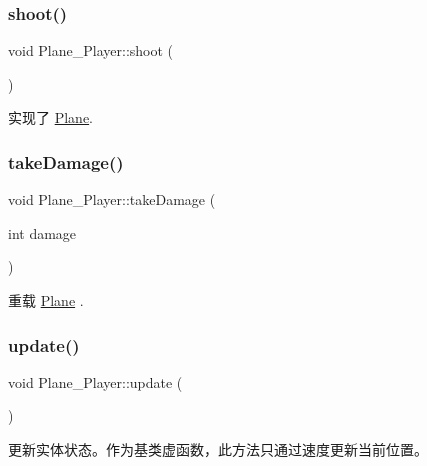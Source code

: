 \subsubsection{\texorpdfstring{shoot()}{shoot()}}
{\footnotesize\ttfamily void Plane\+\_\+\+Player\+::shoot (\begin{DoxyParamCaption}{ }\end{DoxyParamCaption})\hspace{0.3cm}{\ttfamily [virtual]}}



实现了 \hyperlink{class_plane_af999499b5e79309d94004e8d012fe9c4}{Plane}.

\mbox{\label{class_plane___player_a40e7f20858e2738e5a72b15eb1c28421}} 
\subsubsection{\texorpdfstring{take\+Damage()}{takeDamage()}}
{\footnotesize\ttfamily void Plane\+\_\+\+Player\+::take\+Damage (\begin{DoxyParamCaption}\item[{int}]{damage }\end{DoxyParamCaption})\hspace{0.3cm}{\ttfamily [virtual]}}



重载 \hyperlink{class_plane_a1a93dbb00292aaae274c152079f5f6f3}{Plane} .

\mbox{\label{class_plane___player_ae68c08ce11fad9fd164c00eb4db6b348}} 
\subsubsection{\texorpdfstring{update()}{update()}}
{\footnotesize\ttfamily void Plane\+\_\+\+Player\+::update (\begin{DoxyParamCaption}{ }\end{DoxyParamCaption})\hspace{0.3cm}{\ttfamily [virtual]}}



更新实体状态。作为基类虚函数，此方法只通过速度更新当前位置。 



